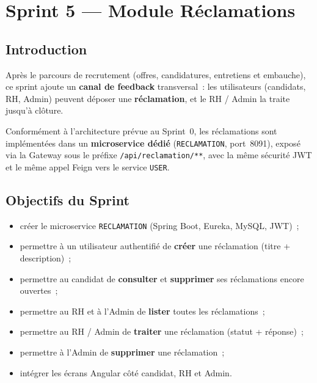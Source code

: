 \chapter{Sprint 5 --- Module Réclamations}

\section{Introduction}

Après le parcours de recrutement (offres, candidatures, entretiens et
embauche), ce sprint ajoute un \textbf{canal de feedback} transversal~:
les utilisateurs (candidats, RH, Admin) peuvent déposer une
\textbf{réclamation}, et le RH / Admin la traite jusqu'à clôture.

Conformément à l'architecture prévue au Sprint~0, les réclamations sont
implémentées dans un \textbf{microservice dédié} (\texttt{RECLAMATION},
port~8091), exposé via la Gateway sous le préfixe
\texttt{/api/reclamation/**}, avec la même sécurité JWT et le même appel
Feign vers le service \texttt{USER}.


\section{Objectifs du Sprint}

\begin{itemize}
  \item créer le microservice \texttt{RECLAMATION} (Spring Boot, Eureka,
        MySQL, JWT)~;
  \item permettre à un utilisateur authentifié de \textbf{créer} une
        réclamation (titre + description)~;
  \item permettre au candidat de \textbf{consulter} et
        \textbf{supprimer} ses réclamations encore ouvertes~;
  \item permettre au RH et à l'Admin de \textbf{lister} toutes les
        réclamations~;
  \item permettre au RH / Admin de \textbf{traiter} une réclamation
        (statut + réponse)~;
  \item permettre à l'Admin de \textbf{supprimer} une réclamation~;
  \item intégrer les écrans Angular côté candidat, RH et Admin.
\end{itemize}


